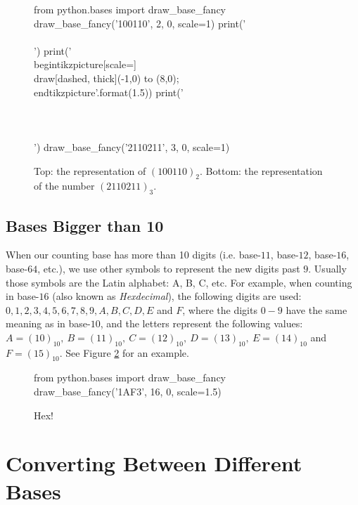 \begin{figure}
  \centering
  \begin{pycode}
from python.bases import draw_base_fancy
draw_base_fancy('100110', 2, 0, scale=1)
print('\\\\')
print('\\begin{{tikzpicture}}[scale={}] \\draw[dashed, thick](-1,0) to (8,0); \\end{{tikzpicture}}'.format(1.5))
print('\\\\~\\\\')
draw_base_fancy('2110211', 3, 0, scale=1)
  \end{pycode}
  \label{fig:nums_in_bases_2_3}
  \caption[Graphical representation of two numbers in bases 2 and 3]{Top: the representation of $\left( 100110 \right)_{2}$. Bottom: the representation of the number $\left( 2110211 \right)_{3}$.}
\end{figure} 

\subsection{Bases Bigger than 10}
When our counting base has more than 10 digits (i.e. base-$11$, base-$12$, base-$16$, base-$64$, etc.), we use other symbols to represent the new digits past $9$. Usually those symbols are the Latin alphabet: A, B, C, etc. For example, when counting in base-$16$ (also known as \textit{Hexdecimal}), the following digits are used: $0,1,2,3,4,5,6,7,8,9,A,B,C,D,E$ and $F$, where the digits $0-9$ have the same meaning as in base-$10$, and the letters represent the following values: $A=\left( 10 \right)_{10},\ B=\left( 11 \right)_{10},\ C=\left( 12 \right)_{10},\ D=\left( 13 \right)_{10},\ E=\left( 14 \right)_{10}$ and $F=\left( 15 \right)_{10}$. See Figure \ref{fig:num_base16} for an example. \par

\begin{figure}
  \centering
  \begin{pycode}
from python.bases import draw_base_fancy
draw_base_fancy('1AF3', 16, 0, scale=1.5)
  \end{pycode}
  \label{fig:num_base16}
  \caption[Hex]{Hex!}
\end{figure} 


\section{Converting Between Different Bases}
